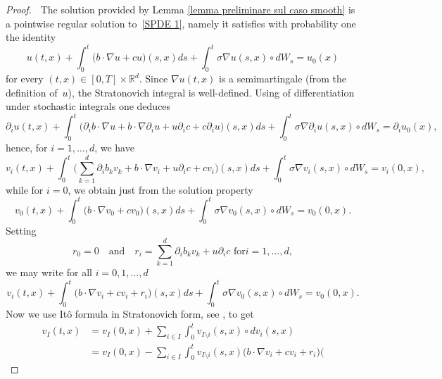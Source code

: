\documentclass[a4paper,10pt]{article}
\newcommand\1{\mathbbm{1}}
\numberwithin{equation}{section}
\begin{document}
\begin{proof}
\textbf{\ }The solution provided by Lemma
\ref{lemma preliminare sul caso smooth} is a pointwise regular solution to~\eqref{SPDE 1}, namely it satisfies with probability one the
identity
\begin{equation*}
u(t,x)  +\int_{0}^{t} \big(b\cdot\nabla u+cu\big)  (
s,x)  ds+\int_{0}^{t}\sigma\nabla u(s,x)  \circ
dW_{s}=u_{0}(x)
\end{equation*}
for every $(t,x) \in [0,T]  \times\mathbb{R}^{d}$.
Since $\nabla u(t,x)$ is a semimartingale (from the definition of~$u$), the Stratonovich integral is well-defined. Using \cite[Theorem 7.10]{KUNITA84} of differentiation under stochastic integrals one deduces
\begin{equation*}
\partial_{i}u(t,x)  +\int_{0}^{t} \big(\partial_{i}b\cdot\nabla
u+b\cdot\nabla\partial_{i}u+u\partial_{i}c+c\partial_{i}u \big)  (
s,x)  ds+\int_{0}^{t}\sigma\nabla\partial_{i}u(s,x)  \circ
dW_{s}=\partial_{i}u_{0}(x),
\end{equation*}
hence, for $i=1,\ldots,d$, we have
\begin{equation*}
v_{i}(t,x)  +\int_{0}^{t}\Big(\sum_{k=1}^{d}\partial_{i}
b_{k}v_{k}+b\cdot\nabla v_{i}+u\partial_{i}c+cv_{i}\Big)  (
s,x)  ds+\int_{0}^{t}\sigma\nabla v_{i}(s,x)  \circ
dW_{s}=v_{i}(0,x),
\end{equation*}
while for $i=0$, we obtain just from the solution property
\begin{equation*}
v_{0}(t,x)  +\int_{0}^{t} \big(b\cdot\nabla v_{0}
+cv_{0}\big)  (s,x)  ds+\int_{0}^{t}\sigma\nabla v_{0}(
s,x)  \circ dW_{s}=v_{0}(0,x)  .
\end{equation*}
Setting
\begin{equation*}
r_{0} =0 \quad \text{and} \quad r_{i} =\sum_{k=1}^{d}\partial_{i}b_{k}v_{k}+u\partial_{i}c\text{ \ for
}i=1,\ldots,d ,
\end{equation*}
we may write for all $i=0,1,\ldots,d$
\begin{equation*}
v_{i}(t,x)  +\int_{0}^{t} \big(b\cdot\nabla v_{i}+cv_{i}
+r_{i}\big)  (s,x)  ds+\int_{0}^{t}\sigma\nabla v_{0}(
s,x)  \circ dW_{s}=v_{0}(0,x).
\end{equation*}
Now we use It\^{o} formula in Stratonovich form, see \cite[Theorem 8.3]{KUNITA84}, to get
\begin{align*}
v_{I}(t,x)   &  =v_{I}(0,x)  +\sum_{i\in I}\int 
_{0}^{t}v_{I\setminus i}(s,x)  \circ dv_{i}(s,x) \\
&  =v_{I}(0,x)  -\sum_{i\in I}\int_{0}^{t}v_{I\setminus i}(
s,x)  \big(b\cdot\nabla v_{i}+cv_{i}+r_{i}\big)  (

\end{align*}
\end{proof}
\end{document}
